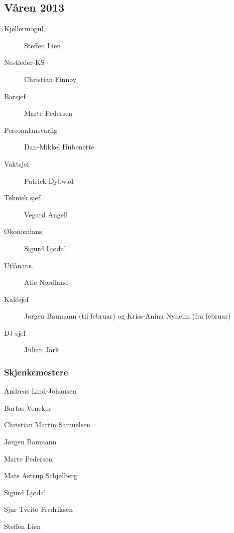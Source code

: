 {\begin{minipage}{0.6\textwidth}
\subsection*{Våren 2013}

\begin{description}
	\item[Kjellermogul] Steffen Lien
	\item[Nestleder-KS] Christian Finnøy
	\item[Barsjef] Marte Pedersen
	\item[Personalansvarlig] Dan-Mikkel Hübenette
	\item[Vaktsjef] Patrick Dybwad
	\item[Teknisk sjef] Vegard Angell
	\item[Økonomians.] Sigurd Ljødal
	\item[Utlånans.] Atle Nordland
	\item[Kafésjef] Jørgen Baumann (til februar) og Kriss-Anina Nyheim (fra februar)
	\item[DJ-sjef] Julian Jark
\end{description}

\subsubsection*{Skjenkemestere}

\begin{description}
	\item Andreas Lind-Johansen
	\item Bartas Venckus
	\item Christian Martin Samuelsen
	\item Jørgen Baumann
	\item Marte Pedersen
	\item Mats Astrup Schjølberg
	\item Sigurd Ljødal
	\item Sjur Tveito Fredriksen
	\item Steffen Lien
\end{description}
\end{minipage}
}
